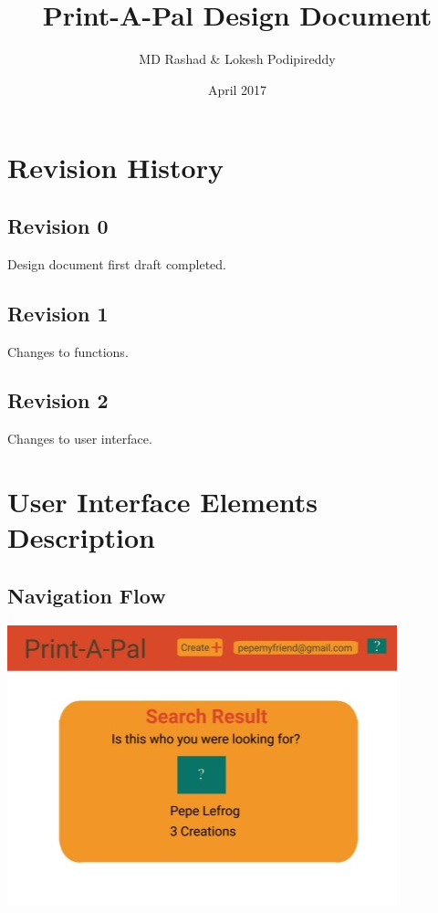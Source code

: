 \documentclass{report}
\title{Print-A-Pal \linebreak Design Document}
\author{MD Rashad \& Lokesh Podipireddy}
\date{\vfill April 2017}
\begin{document}
\maketitle

\tableofcontents

\chapter{Revision History}
\section{Revision 0}
Design document first draft completed.
\section{Revision 1} Changes to functions.
\section{Revision 2} Changes to user interface.

\chapter{User Interface Elements Description}
\section{Navigation Flow}

\begin{center}
\includegraphics[width=\textwidth/2]{searchresults.jpg}
\end{center}
\end{document}
